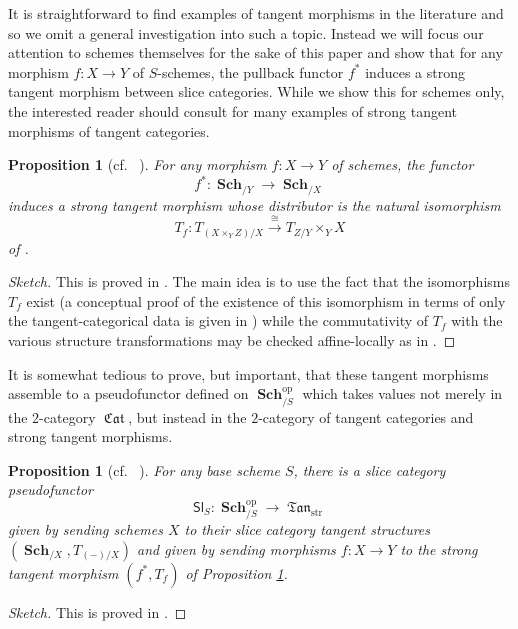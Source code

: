\documentclass{amsart}
\newtheorem{proposition}[equation]{Proposition}
\theoremstyle{definition}
\DeclareMathOperator{\fTan}{\mathfrak{Tan}}
\DeclareMathOperator{\fCat}{\mathfrak{Cat}}
\DeclareMathOperator{\op}{op}
\DeclareMathOperator{\Sch}{\mathbf{Sch}}
\numberwithin{equation}{subsection}
\begin{document}
It is straightforward to find examples of tangent morphisms in the literature and so we omit a general investigation into such a topic. Instead we will focus our attention to schemes themselves for the sake of this paper and show that for any morphism $f:X \to Y$ of $S$-schemes, the pullback functor $f^{\ast}$ induces a strong tangent morphism between slice categories. While we show this for schemes only, the interested reader should consult \cite[Sections 6, 7]{PronkVooys} for many examples of strong tangent morphisms of tangent categories.

\begin{proposition}[{cf.~ \cite[Proposition 6.15]{PronkVooys}}]\label{Prop: Pullback functor strong tangent for schemes}
For any morphism $f:X \to Y$ of schemes, the functor
\[
f^{\ast}:\Sch_{/Y} \to \Sch_{/X}
\]
induces a strong tangent morphism whose distributor is the natural isomorphism
\[
T_f:T_{(X \times_Y Z)/X} \xrightarrow{\cong} T_{Z/Y} \times_Y X
\]
of \cite[Line 16.5.12.2]{EGA44}.
\end{proposition}
\begin{proof}[Sketch]
This is proved in \cite[Proposition 6.15]{PronkVooys}. The main idea is to use the fact that the isomorphisms $T_f$ exist (a conceptual proof of the existence of this isomorphism in terms of only the tangent-categorical data is given in \cite[Proposition 4.1.14]{JSMeMapFlavoursInTanCats}) while the commutativity of $T_f$ with the various structure transformations may be checked affine-locally as in \cite[Lemmas 6.10 -- 6.14]{PronkVooys}.
\end{proof}

It is somewhat tedious to prove, but important, that these tangent morphisms assemble to a pseudofunctor defined on $\Sch_{/S}^{\op}$ which takes values not merely in the $2$-category $\fCat$, but instead in the $2$-category of tangent categories and strong tangent morphisms.

\begin{proposition}[{cf.~ \cite[Proposition 6.16]{PronkVooys}}]\label{Prop: Section Tangent: PSeudofunctor in Tan}
For any base scheme $S$, there is a slice category pseudofunctor
\[
\mathsf{Sl}_{S}:\Sch_{/S}^{\op} \to \fTan_{\operatorname{str}}
\]
given by sending schemes $X$ to their slice category tangent structures $(\Sch_{/X}, T_{(-)/X})$ and given by sending morphisms $f:X \to Y$ to the strong tangent morphism $(f^{\ast},T_f)$ of Proposition \ref{Prop: Pullback functor strong tangent for schemes}.
\end{proposition}
\begin{proof}[Sketch]
This is proved in \cite[Proposition 6.16]{PronkVooys}. 
\end{proof}
\end{document}
